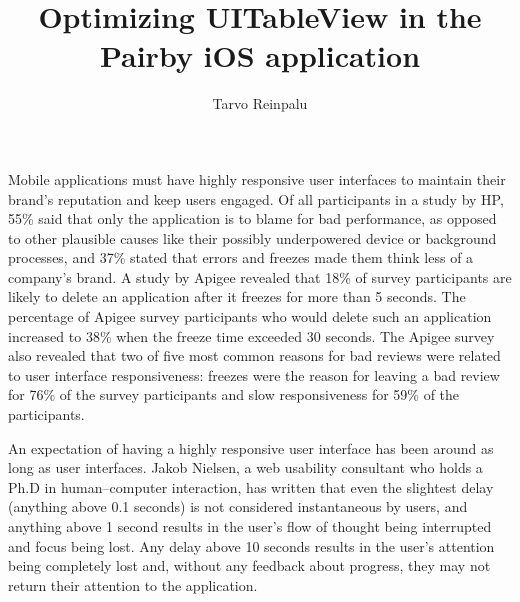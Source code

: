 \documentclass[a4paper,12pt]{article}
\begin{document}
\begin{itkTitlePage}
\title{Optimizing UITableView in the Pairby iOS application}
\author{Tarvo Reinpalu}
\end{itkTitlePage}




\itkMakeAuthorDeclaration

\clearpage
\thispagestyle{empty}
\setcounter{tocdepth}{2}
\tableofcontents




Mobile applications must have highly responsive user interfaces to maintain their brand's reputation and keep users engaged.\cite{AppSpeedStudyHP}\cite{AppSpeedStudyApigee} Of all participants in a study by HP, 55\% said that only the application is to blame for bad performance, as opposed to other plausible causes like their possibly underpowered device or background processes, and 37\% stated that errors and freezes made them think less of a company’s brand.\cite{AppSpeedStudyHP} A study by Apigee revealed that 18\% of survey participants are likely to delete an application after it freezes for more than 5 seconds.\cite{AppSpeedStudyApigee} The percentage of Apigee survey participants who would delete such an application increased to 38\% when the freeze time exceeded 30 seconds.\cite{AppSpeedStudyApigee} The Apigee survey also revealed that two of five most common reasons for bad reviews were related to user interface responsiveness: freezes were the reason for leaving a bad review for 76\% of the survey participants and slow responsiveness for 59\% of the participants.\cite{AppSpeedStudyApigee}

An expectation of having a highly responsive user interface has been around as long as user interfaces.\cite{NielsenUsabilityEngineering} Jakob Nielsen, a web usability consultant who holds a Ph.D in human–computer interaction\cite{JakobNielsenNNGroup}, has written that even the slightest delay (anything above 0.1 seconds) is not considered instantaneous by users, and anything above 1 second results in the user's flow of thought being interrupted and focus being lost.\cite{NielsenUsabilityEngineering} Any delay above 10 seconds results in the user's attention being completely lost and, without any feedback about progress, they may not return their attention to the application.\cite{NielsenUsabilityEngineering}
\end{document}
